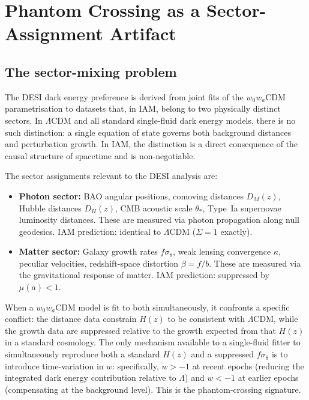 \documentclass[12pt,a4paper]{article}
\newcommand{\lcdm}{$\Lambda$CDM}
\begin{document}
\section{Phantom Crossing as a Sector-Assignment Artifact}
\label{sec:phantom}

\subsection{The sector-mixing problem}
\label{sec:mixing}

The DESI dark energy preference is derived from joint fits of the
$w_0 w_a$CDM parametrisation to datasets that, in IAM, belong to
two physically distinct sectors.
In \lcdm{} and all standard single-fluid dark energy models, there is no
such distinction: a single equation of state governs both background
distances and perturbation growth.
In IAM, the distinction is a direct consequence of the causal structure
of spacetime and is non-negotiable.

The sector assignments relevant to the DESI analysis are:

\begin{itemize}
\item \textbf{Photon sector:} BAO angular positions, comoving distances
  $D_M(z)$, Hubble distances $D_H(z)$, CMB acoustic scale $\theta_*$,
  Type~Ia supernovae luminosity distances.
  These are measured via photon propagation along null geodesics.
  IAM prediction: identical to \lcdm{} ($\Sigma = 1$ exactly).

\item \textbf{Matter sector:} Galaxy growth rates $f\sigma_8$, weak lensing
  convergence $\kappa$, peculiar velocities, redshift-space distortion
  $\beta = f/b$.
  These are measured via the gravitational response of matter.
  IAM prediction: suppressed by $\mu(a) < 1$.
\end{itemize}

When a $w_0 w_a$CDM model is fit to both simultaneously, it confronts
a specific conflict: the distance data constrain $H(z)$ to be
consistent with \lcdm{}, while the growth data are suppressed relative
to the growth expected from that $H(z)$ in a standard cosmology.
The only mechanism available to a single-fluid fitter to simultaneously
reproduce both a standard $H(z)$ and a suppressed $f\sigma_8$ is to
introduce time-variation in $w$: specifically, $w > -1$ at recent
epochs (reducing the integrated dark energy contribution relative to
$\Lambda$) and $w < -1$ at earlier epochs (compensating at the
background level).
This is the phantom-crossing signature.
\end{document}
